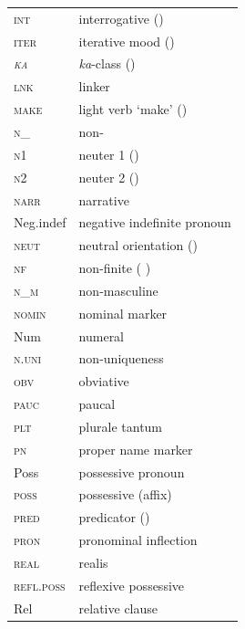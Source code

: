 \documentclass[output=collectionpaper]{langsci/langscibook}
\begin{document}
\begin{tabularx}{.48\textwidth}{lQ}
\scshape int	 & 	interrogative   ()\\
\scshape iter	 & 	iterative mood   ()\\
\scshape \itshape ka	 & 	\textit{ka}-class ()\\
\scshape lnk	 & 	linker\\
\scshape make	 & 	light verb `make'  ()\\
\scshape n\_	 & 	non-\\
\scshape n1	 & 	neuter 1 ()\\
\scshape n2	 & 	neuter 2 ()\\
\scshape narr	 & 	narrative\\
\normalfont Neg.indef	 & 	negative indefinite  pronoun\\
\scshape neut	 & 	neutral orientation  () \\
\scshape nf	 & 	non-finite ( )\\
\scshape n\_m	 & 	non-masculine\\
\scshape nomin	 & 	nominal marker\\
\normalfont Num	 & 	numeral\\
\scshape n.uni	 & 	non-uniqueness\\
\scshape obv	 & 	obviative\\
\scshape pauc	 & 	paucal\\
\scshape plt	 & 	plurale tantum\\
\scshape pn	 & 	proper name marker\\
\normalfont Poss	 & 	possessive pronoun\\
\scshape poss	 & 	possessive (affix)\\
\scshape pred	 & 	predicator ()\\
\scshape pron	 & 	pronominal inflection\\
\scshape real	 & 	realis\\
\scshape refl.poss	 & 	reflexive possessive\\
\normalfont Rel	 & 	relative clause\\

\end{tabularx}
\end{document}
